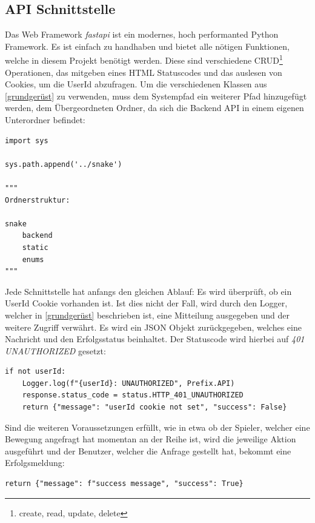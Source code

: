 \documentclass[a4paper,12pt]{scrartcl}
\begin{document}
\subsection{API Schnittstelle}

Das Web Framework \textit{fastapi} ist ein modernes, hoch performanted Python Framework. Es ist einfach zu handhaben und bietet alle nötigen Funktionen, welche in diesem Projekt benötigt werden. Diese sind verschiedene CRUD\footnote{create, read, update, delete} Operationen, das mitgeben eines HTML Statuscodes und das auslesen von Cookies, um die UserId abzufragen. Um die verschiedenen Klassen aus \autoref{grundgerüst} zu verwenden, muss dem Systempfad ein weiterer Pfad hinzugefügt werden, dem Übergeordneten Ordner, da sich die Backend API in einem eigenen Unterordner befindet:

\begin{lstlisting}
import sys

sys.path.append('../snake')

"""
Ordnerstruktur:

snake
	backend
	static
	enums
"""
\end{lstlisting}

Jede Schnittstelle hat anfangs den gleichen Ablauf: Es wird überprüft, ob ein UserId Cookie vorhanden ist. Ist dies nicht der Fall, wird durch den Logger, welcher in \autoref{grundgerüst} beschrieben ist, eine Mitteilung ausgegeben und der weitere Zugriff verwährt. Es wird ein JSON Objekt zurückgegeben, welches eine Nachricht und den Erfolgsstatus beinhaltet. Der Statuscode wird hierbei auf \textit{401 UNAUTHORIZED} gesetzt:

\begin{lstlisting}
if not userId:
	Logger.log(f"{userId}: UNAUTHORIZED", Prefix.API)
	response.status_code = status.HTTP_401_UNAUTHORIZED
	return {"message": "userId cookie not set", "success": False}
\end{lstlisting}

Sind die weiteren Voraussetzungen erfüllt, wie in etwa ob der Spieler, welcher eine Bewegung angefragt hat momentan an der Reihe ist, wird die jeweilige Aktion ausgeführt und der Benutzer, welcher die Anfrage gestellt hat, bekommt eine Erfolgsmeldung:

\begin{lstlisting}
return {"message": f"success message", "success": True}
\end{lstlisting}
\end{document}
